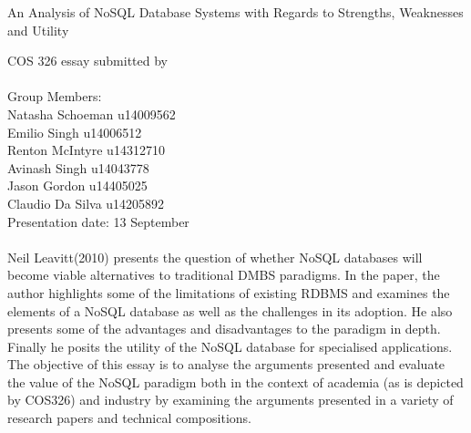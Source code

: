 \documentclass[12pt]{article}
\begin{document}
\begin{titlepage}

\begin{center}
\begin{Huge}
An Analysis of NoSQL Database Systems with Regards to Strengths, Weaknesses and Utility
\begin{large}
\begin{center}
COS 326 essay submitted by
\\
\\
Group Members:\\
Natasha Schoeman u14009562
\\
Emilio Singh u14006512
\\
Renton McIntyre u14312710
\\
Avinash Singh u14043778
\\
Jason Gordon u14405025 
\\
Claudio Da Silva u14205892 
\\
Presentation date: 13 September

\end{center}
\end{large}
\end{Huge}

\end{center}
\end{titlepage}
\pagebreak

\paragraph{}
Neil Leavitt(2010) presents the question of whether NoSQL databases will become viable alternatives to traditional DMBS paradigms. In the paper, the author highlights some of the limitations of existing RDBMS and examines the elements of a NoSQL database as well as the challenges in its adoption. He also presents some of the advantages and disadvantages to the paradigm in depth. Finally he posits the utility of the NoSQL database for specialised applications. The objective of this essay is to analyse the arguments presented and evaluate the value of the NoSQL paradigm both in the context of academia (as is depicted by COS326) and industry by examining the arguments presented in a variety of research papers and technical compositions.
\end{document}
